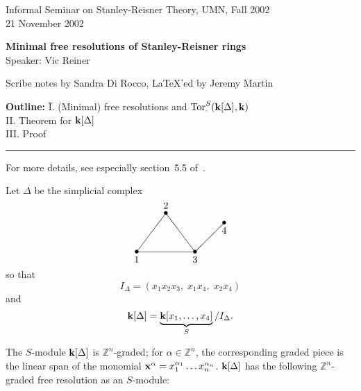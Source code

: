 \documentclass{amsart}
\newcommand{\Tor}{\mathop{\rm Tor}\nolimits}
\newcommand{\fld}{{\bf k}}
\newcommand{\ZZ}{{\mathbb Z}}
\newcommand{\xx}{{\bf x}}
\newcommand{\puttext}[2] {\put(#1){\makebox(0,0){#2}}}
\newcommand{\putdot}[1]  {\put(#1){\makebox(0,0){$\bullet$}}}
\newcommand{\putline}[3] {\put(#1){\line(#2){#3}}}
\begin{document}
Informal Seminar on Stanley-Reisner Theory, UMN, Fall 2002 \\
21 November 2002

{\bf Minimal free resolutions of Stanley-Reisner rings} \\
Speaker: Vic Reiner

Scribe notes by Sandra Di Rocco, LaTeX'ed by Jeremy Martin \\

\begin{tabbing}
{\bf Outline:} \= I. (Minimal) free resolutions and $\Tor^S_\cdot(\fld[\Delta],\fld)$ \\
\> II. Theorem for $\fld[\Delta]$ \\
\> III. Proof \\
\end{tabbing}

\hrule

For more details, see especially section~5.5 of~\cite{BH}.

Let $\Delta$ be the simplicial complex
        \begin{equation} \label{delta-ex}
        \begin{picture}(110,60)
	\putdot{10,10}  \puttext{10, 2}{$1$}
	\putdot{40,50}  \puttext{40,58}{$2$}
	\putdot{70,10}  \puttext{70, 2}{$3$}
	\putdot{100,40}  \puttext{100,32}{$4$}
        \putline{10,10}{3,4}{30}	%
        \putline{10,10}{1,0}{60}	%
        \putline{70,10}{-3,4}{30}	%
        \putline{70,10}{1,1}{30}	%
        \end{picture}
        \end{equation}
so that
	$$I_\Delta = (x_1x_2x_3, \; x_1x_4, \; x_2x_4)$$
and
	$$\fld[\Delta] = \underbrace{\fld[x_1,\dots,x_4]}_S / I_\Delta.$$

The $S$-module $\fld[\Delta]$ is $\ZZ^n$-graded; for $\alpha \in \ZZ^n$, the corresponding
graded piece is the linear span of the monomial $\xx^\alpha = x_1^{\alpha_1} \dots
x_n^{\alpha_n}$.  $\fld[\Delta]$ has the following $\ZZ^n$-graded free resolution as an
$S$-module:
\end{document}
